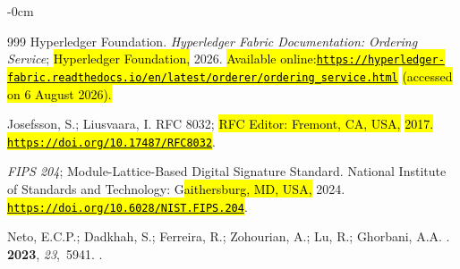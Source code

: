 \documentclass[blockchains,review,accept,moreauthors]{Definitions/mdpi}
\begin{document}
\begin{adjustwidth}{-\extralength}{0cm}
\begin{thebibliography}{999}
{Hyperledger Foundation}.
\newblock \emph{Hyperledger Fabric Documentation: Ordering Service}; \hl{Hyperledger Foundation,}  2026.
\newblock \hl{Available online:}\space \href{https://hyperledger-fabric.readthedocs.io/en/latest/orderer/ordering_service.html}{\hl{\mbox{\nolinkurl{https://hyperledger-fabric.readthedocs.io/}}}}\allowbreak\href{https://hyperledger-fabric.readthedocs.io/en/latest/orderer/ordering_service.html}{\hl{\mbox{\nolinkurl{en/}}}}\allowbreak\href{https://hyperledger-fabric.readthedocs.io/en/latest/orderer/ordering_service.html}{\hl{\mbox{\nolinkurl{latest/}}}}\allowbreak\href{https://hyperledger-fabric.readthedocs.io/en/latest/orderer/ordering_service.html}{\hl{\mbox{\nolinkurl{orderer/}}}}\allowbreak\href{https://hyperledger-fabric.readthedocs.io/en/latest/orderer/ordering_service.html}{\hl{\mbox{\nolinkurl{ordering_service.html}}}} \space\hl{(accessed on 6 August 2026).}

Josefsson, S.; Liusvaara, I.
  RFC 8032; \hl{RFC Editor: Fremont, CA, USA,} \hl{2017.} %
\newblock \href{https://doi.org/10.17487/RFC8032}{\hl{\mbox{\nolinkurl{https://doi.org/}}}}\allowbreak\href{https://doi.org/10.17487/RFC8032}{\hl{\mbox{\nolinkurl{10.17487/}}}}\allowbreak\href{https://doi.org/10.17487/RFC8032}{\hl{\mbox{\nolinkurl{RFC8032}}}}.


\newblock \emph{FIPS 204}; {Module-Lattice-Based Digital Signature Standard.} National Institute of Standards and Technology: G\hl{aithersburg, MD, USA,} 2024.
\newblock \href{https://doi.org/10.6028/NIST.FIPS.204}{\hl{\mbox{\nolinkurl{https://doi.org/}}}}\allowbreak\href{https://doi.org/10.6028/NIST.FIPS.204}{\hl{\mbox{\nolinkurl{10.6028/}}}}\allowbreak\href{https://doi.org/10.6028/NIST.FIPS.204}{\hl{\mbox{\nolinkurl{NIST.FIPS.204}}}}.

Neto, E.C.P.; Dadkhah, S.; Ferreira, R.; Zohourian, A.; Lu, R.; Ghorbani, A.A.
.
 {\bf 2023}, {\em 23},~5941.
.


\end{thebibliography}
\end{adjustwidth}
\end{document}
